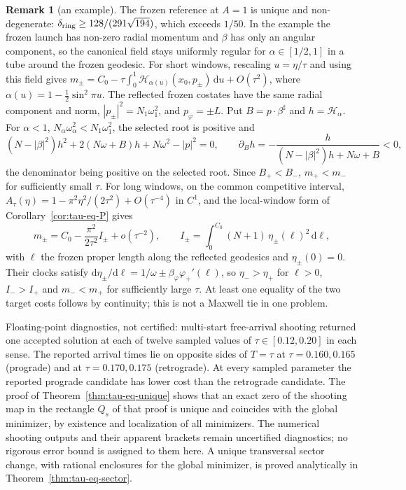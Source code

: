 \documentclass[aip,jmp,amsmath,amssymb,reprint]{revtex4-2}
\newcommand{\dd}{\mathrm{d}}
\theoremstyle{plain}
\theoremstyle{definition}
\newtheorem{remark}[proposition]{Remark}
\begin{document}
\begin{remark}[an example]
The frozen reference at $A=1$ is unique and non-degenerate: $\delta_{\rm ring}\ge128/(291\sqrt{194})$, which
exceeds $1/50$.
In the example the frozen launch has non-zero radial momentum and $\beta$ has only an angular
component, so the canonical field stays uniformly regular for $\alpha\in[1/2,1]$ in a tube around the
frozen geodesic. For short windows, rescaling $u=\eta/\tau$ and using this field gives
$m_\pm=C_0-\tau\int_0^1\mathcal H_{\alpha(u)}(x_0,p_\pm)\,\dd u+O(\tau^2)$, where $\alpha(u)=1-\frac12\sin^2\pi u$. The
reflected frozen costates have the same radial component and norm, $|p_\pm|^2=N_1\omega_1^2$, and
$p_\varphi=\pm L$. Put $B=p\cdot\beta^\sharp$ and $h=\mathcal H_\alpha$. For $\alpha<1$, $N_\alpha\omega_\alpha^2<N_1\omega_1^2$, the
selected root is positive and
\[
  (N-|\beta|^2)h^2+2(N\omega+B)h+N\omega^2-|p|^2=0,\qquad
  \partial_Bh=-\frac{h}{(N-|\beta|^2)h+N\omega+B}<0,
\]
the denominator being positive on the selected root. Since $B_+<B_-$, $m_+<m_-$ for sufficiently
small $\tau$. For long windows, on the common competitive interval,
$A_\tau(\eta)=1-\pi^2\eta^2/(2\tau^2)+O(\tau^{-4})$ in $C^1$, and the local-window form of
Corollary~\ref{cor:tau-eq-P} gives
\[
  m_\pm=C_0-\frac{\pi^2}{2\tau^2}I_\pm+o(\tau^{-2}),\qquad I_\pm=\int_0^{C_0}(N+1)\,\eta_\pm(\ell)^2\,\dd\ell,
\]
with $\ell$ the frozen proper length along the reflected geodesics and $\eta_\pm(0)=0$. Their clocks
satisfy $\dd\eta_\pm/\dd\ell=1/\omega\pm\beta_\varphi\varphi_+'(\ell)$, so $\eta_->\eta_+$ for $\ell>0$, $I_->I_+$ and $m_-<m_+$
for sufficiently large $\tau$. At least one equality of the two target costs follows by continuity;
this is not a Maxwell tie in one problem.

Floating-point diagnostics, not certified: multi-start free-arrival shooting returned one accepted
solution at each of twelve sampled values of $\tau\in[0.12,0.20]$ in each sense. The reported arrival
times lie on opposite sides of $T=\tau$ at $\tau=0.160,0.165$ (prograde) and at $\tau=0.170,0.175$
(retrograde). At every sampled parameter the reported prograde candidate has lower cost than the
retrograde candidate. The proof of Theorem~\ref{thm:tau-eq-unique} shows that an exact zero of
the shooting map in the rectangle $Q_s$ of that proof is unique and coincides with the global minimizer, by existence and
localization of all minimizers. The numerical shooting outputs and their apparent brackets
remain uncertified diagnostics; no rigorous error bound is assigned to them here. A unique
transversal sector change, with rational enclosures for the global minimizer, is proved
analytically in Theorem~\ref{thm:tau-eq-sector}.
\end{remark}
\end{document}
